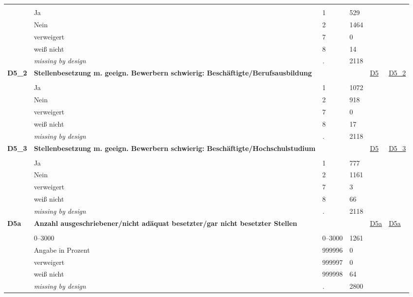 \begin{longtable}{| L{2.45cm} | L{6cm} | C{1.5cm} | R{1cm} | C{2.25cm} | C{2.25cm} |}
   &  &  &  &  &  \\ 
   & Ja & 1 & 529 &  &  \\ 
   & Nein & 2 & 1464 &  &  \\ 
   & verweigert & 7 & 0 &  &  \\ 
   & weiß nicht & 8 & 14 &  &  \\ 
   & \textit{missing by design} & \textit{.} & 2118 &  &  \\ 
   \midrule
\textbf{D5\_2}\label{var:D5:2} & \textbf{Stellenbesetzung m. geeign. Bewerbern schwierig: Beschäftigte/Berufsausbildung} &  &  & \hyperref[D5]{D5} & \hyperref[var:suf:D5:2]{D5\_2} \\ 
   &  &  &  &  &  \\ 
   & Ja & 1 & 1072 &  &  \\ 
   & Nein & 2 & 918 &  &  \\ 
   & verweigert & 7 & 0 &  &  \\ 
   & weiß nicht & 8 & 17 &  &  \\ 
   & \textit{missing by design} & \textit{.} & 2118 &  &  \\ 
   \midrule
\textbf{D5\_3}\label{var:D5:3} & \textbf{Stellenbesetzung m. geeign. Bewerbern schwierig: Beschäftigte/Hochschulstudium} &  &  & \hyperref[D5]{D5} & \hyperref[var:suf:D5:3]{D5\_3} \\ 
   &  &  &  &  &  \\ 
   & Ja & 1 & 777 &  &  \\ 
   & Nein & 2 & 1161 &  &  \\ 
   & verweigert & 7 & 3 &  &  \\ 
   & weiß nicht & 8 & 66 &  &  \\ 
   & \textit{missing by design} & \textit{.} & 2118 &  &  \\ 
   \midrule
\textbf{D5a}\label{var:D5a} & \textbf{Anzahl ausgeschriebener/nicht adäquat besetzter/gar nicht besetzter Stellen} &  &  & \hyperref[D5a]{D5a} & \hyperref[var:suf:D5a]{D5a} \\ 
   &  &  &  &  &  \\ 
   & 0--3000 & 0--3000 & 1261 &  &  \\ 
   & Angabe in Prozent & 999996 & 0 &  &  \\ 
   & verweigert & 999997 & 0 &  &  \\ 
   & weiß nicht & 999998 & 64 &  &  \\ 
   & \textit{missing by design} & \textit{.} & 2800 &  &  \\ 
   \midrule

\end{longtable}

